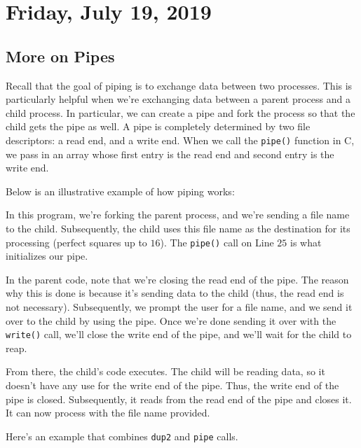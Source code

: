 \section{Friday, July 19, 2019}

\subsection{More on Pipes}

Recall that the goal of piping is to exchange data between two processes.  This is particularly helpful when we're exchanging data between a parent process and a child process. In particular, we can create a pipe and fork the process so that the child gets the pipe as well. A pipe is completely determined by two file descriptors: a read end, and a write end. When we call the \verb!pipe()! function in C, we pass in an array whose first entry is the read end and second entry is the write end.

Below is an illustrative example of how piping works:

\lstset{caption=Piping Example 1}
\begin{center}

\end{center}

In this program, we're forking the parent process, and we're sending a file name to the child. Subsequently, the child uses this file name as the destination for its processing (perfect squares up to $16$). The \verb!pipe()! call on Line $25$ is what initializes our pipe. 

In the parent code, note that we're closing the read end of the pipe. The reason why this is done is because it's sending data to the child (thus, the read end is not necessary). Subsequently, we prompt the user for a file name, and we send it over to the child by using the pipe. Once we're done sending it over with the \verb!write()! call, we'll close the write end of the pipe, and we'll wait for the child to reap.

From there, the child's code executes. The child will be reading data, so it doesn't have any use for the write end of the pipe. Thus, the write end of the pipe is closed. Subsequently, it reads from the read end of the pipe and closes it. It can now process with the file name provided.


Here's an example that combines \verb!dup2! and \verb!pipe! calls. 

\lstset{caption=Piping Example 2}
\begin{center}

\end{center}

